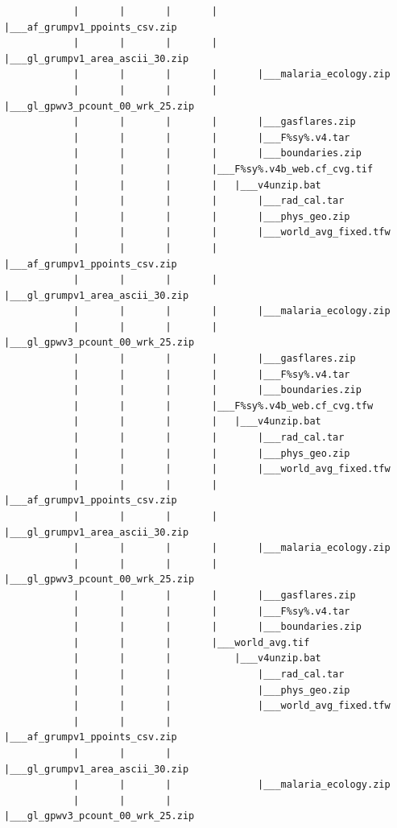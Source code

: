 \documentclass[]{book}
\begin{document}
\begin{verbatim}
            |       |       |       |       |___af_grumpv1_ppoints_csv.zip
            |       |       |       |       |___gl_grumpv1_area_ascii_30.zip
            |       |       |       |       |___malaria_ecology.zip
            |       |       |       |       |___gl_gpwv3_pcount_00_wrk_25.zip
            |       |       |       |       |___gasflares.zip
            |       |       |       |       |___F%sy%.v4.tar
            |       |       |       |       |___boundaries.zip
            |       |       |       |___F%sy%.v4b_web.cf_cvg.tif
            |       |       |       |   |___v4unzip.bat
            |       |       |       |       |___rad_cal.tar
            |       |       |       |       |___phys_geo.zip
            |       |       |       |       |___world_avg_fixed.tfw
            |       |       |       |       |___af_grumpv1_ppoints_csv.zip
            |       |       |       |       |___gl_grumpv1_area_ascii_30.zip
            |       |       |       |       |___malaria_ecology.zip
            |       |       |       |       |___gl_gpwv3_pcount_00_wrk_25.zip
            |       |       |       |       |___gasflares.zip
            |       |       |       |       |___F%sy%.v4.tar
            |       |       |       |       |___boundaries.zip
            |       |       |       |___F%sy%.v4b_web.cf_cvg.tfw
            |       |       |       |   |___v4unzip.bat
            |       |       |       |       |___rad_cal.tar
            |       |       |       |       |___phys_geo.zip
            |       |       |       |       |___world_avg_fixed.tfw
            |       |       |       |       |___af_grumpv1_ppoints_csv.zip
            |       |       |       |       |___gl_grumpv1_area_ascii_30.zip
            |       |       |       |       |___malaria_ecology.zip
            |       |       |       |       |___gl_gpwv3_pcount_00_wrk_25.zip
            |       |       |       |       |___gasflares.zip
            |       |       |       |       |___F%sy%.v4.tar
            |       |       |       |       |___boundaries.zip
            |       |       |       |___world_avg.tif
            |       |       |           |___v4unzip.bat
            |       |       |               |___rad_cal.tar
            |       |       |               |___phys_geo.zip
            |       |       |               |___world_avg_fixed.tfw
            |       |       |               |___af_grumpv1_ppoints_csv.zip
            |       |       |               |___gl_grumpv1_area_ascii_30.zip
            |       |       |               |___malaria_ecology.zip
            |       |       |               |___gl_gpwv3_pcount_00_wrk_25.zip

\end{verbatim}
\end{document}

